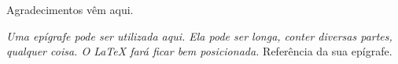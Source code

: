 \begin{agradecimentos}
Agradecimentos v\^em aqui.

\end{agradecimentos}


\cleardoublepage
\newpage

\phantom{11}
\vfill\vfill\vfill
\begin{flushright}
  \begin{minipage}{0.7\textwidth}
    \emph{Uma ep\'igrafe pode ser utilizada aqui. Ela pode ser longa,
      conter diversas partes, qualquer coisa. O LaTeX far\'a ficar bem
      posicionada.}
    \newline
    \newline
    \scriptsize{Refer\^encia da sua ep\'igrafe.}
  \end{minipage}
\end{flushright}
